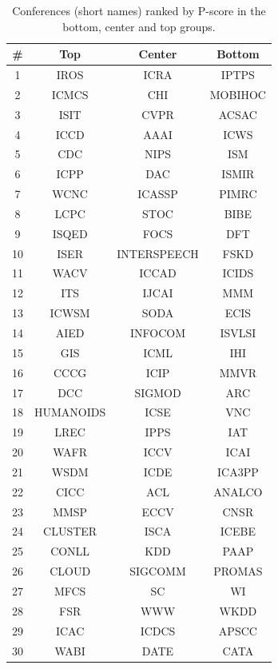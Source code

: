 \documentclass[notitlepage]{svjour3}
\begin{document}
\begin{table}[h!]
  \small
  \centering
  \begin{tabular}{c c c c} 
  \toprule
  \# & Top & Center & Bottom \\ 
  \midrule
  1  & IROS      & ICRA        & IPTPS   \\
  2  & ICMCS     & CHI         & MOBIHOC \\
  3  & ISIT      & CVPR        & ACSAC   \\
  4  & ICCD      & AAAI        & ICWS    \\
  5  & CDC       & NIPS        & ISM     \\
  6  & ICPP      & DAC         & ISMIR   \\
  7  & WCNC      & ICASSP      & PIMRC   \\
  8  & LCPC      & STOC        & BIBE    \\
  9  & ISQED     & FOCS        & DFT     \\
  10 & ISER      & INTERSPEECH & FSKD    \\
  11 & WACV      & ICCAD       & ICIDS   \\
  12 & ITS       & IJCAI       & MMM     \\
  13 & ICWSM     & SODA        & ECIS    \\
  14 & AIED      & INFOCOM     & ISVLSI  \\
  15 & GIS       & ICML        & IHI     \\
  16 & CCCG      & ICIP        & MMVR    \\
  17 & DCC       & SIGMOD      & ARC     \\
  18 & HUMANOIDS & ICSE        & VNC     \\
  19 & LREC      & IPPS        & IAT     \\
  20 & WAFR      & ICCV        & ICAI    \\
  21 & WSDM      & ICDE        & ICA3PP  \\
  22 & CICC      & ACL         & ANALCO  \\
  23 & MMSP      & ECCV        & CNSR    \\
  24 & CLUSTER   & ISCA        & ICEBE   \\
  25 & CONLL     & KDD         & PAAP    \\
  26 & CLOUD     & SIGCOMM     & PROMAS  \\
  27 & MFCS      & SC          & WI      \\
  28 & FSR       & WWW         & WKDD    \\
  29 & ICAC      & ICDCS       & APSCC   \\
  30 & WABI      & DATE        & CATA    \\
  \bottomrule
  \end{tabular}
  \caption{Conferences (short names) ranked by P-score in the bottom, center and top groups.}
  \label{tab:conferences}
\end{table}
\end{document}
